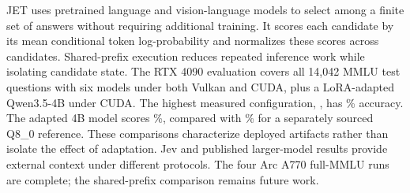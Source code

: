 JET uses pretrained language and vision-language models to select among a
finite set of answers without requiring additional training. It scores each
candidate by its mean conditional token log-probability and normalizes these
scores across candidates. Shared-prefix execution reduces repeated inference
work while isolating candidate state. The RTX 4090 evaluation covers all
14,042 MMLU test questions with six models under both Vulkan and CUDA, plus
a LoRA-adapted Qwen3.5-4B under CUDA. The highest measured configuration,
, has \% accuracy.
The adapted 4B model scores \%,
compared with \% for a separately sourced
Q8\_0 reference. These comparisons characterize deployed artifacts rather
than isolate the effect of adaptation. Jev and published larger-model results
provide external context under different protocols. The four Arc A770
full-MMLU runs are complete; the shared-prefix comparison remains future work.
